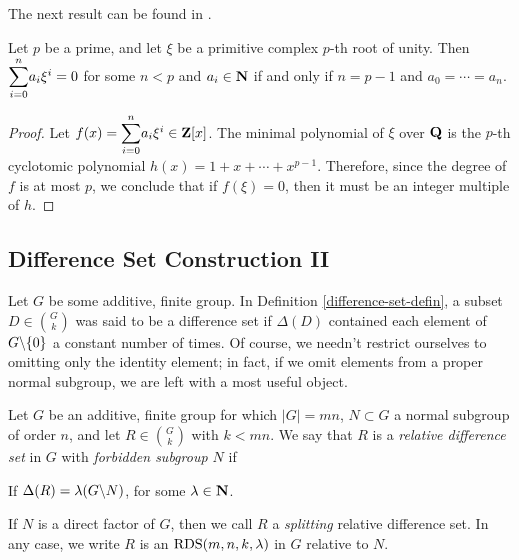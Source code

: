 \documentclass[../../../main]{subfiles}
\begin{document}
 The next result can be found in \cite{lam-leung}.
 
 \begin{lem}\label{butson lemma}
  Let $p$ be a prime, and let $\xi$ be a primitive complex $p$-th root of unity. Then $\ssum_{i=0}^n a_i\xi^i = 0$ for some $n < p$ and $a_i \in \mathbf{N}$ if and only if $n = p-1$ and $a_0 = \cdots = a_n$.
 \end{lem}
 
 \begin{proof}
  Let $f(x) = \ssum_{i=0}^n a_i\xi^i \in \Z[x]$. The minimal polynomial of $\xi$ over $\mathbf{Q}$ is the $p$-th cyclotomic polynomial $h(x) = 1 + x + \cdots + x^{p-1}$. Therefore, since the degree of $f$ is at most $p$, we conclude that if $f(\xi) = 0$, then it must be an integer multiple of $h$. 
 \end{proof}
 
 \dinkus
 
 \subsection{Difference Set Construction II}
 
 Let $G$ be some additive, finite group. In Definition \ref{difference-set-defin}, a subset $D \in \binom{G}{k}$ was said to be a difference set if $\Delta(D)$ contained each element of $G\backslash\{0\}$ a constant number of times. Of course, we needn't restrict ourselves to omitting only the identity element; in fact, if we omit elements from a proper normal subgroup, we are left with a most useful object.
 
 \begin{defin}\label{relative-diff-set-def}
  Let $G$ be an additive, finite group for which $|G|=mn$, $N \subset G$ a normal subgroup of order $n$, and let $R \in \binom{G}{k}$ with $k<mn$. We say that $R$ is a {\it relative difference set} in $G$ with {\it forbidden subgroup $N$} if
  \begin{defenum}
  \item If $\Delta(R)=\lambda(G\backslash N)$, for some $\lambda \in \mathbf{N}$.
  \end{defenum}
  If $N$ is a direct factor of $G$, then we call $R$ a {\it splitting} relative difference set. In any case, we write $R$ is an $\text{RDS}(m,n,k,\lambda)$ in $G$ relative to $N$.
 \end{defin}
 
\end{document}
